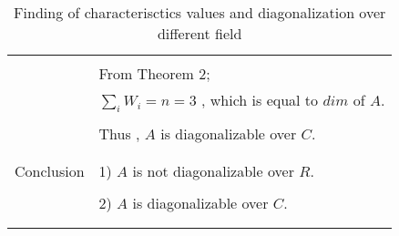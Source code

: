 \begin{longtable}{|l|l|}
&\\
& From Theorem 2;\\
& $\sum_{i} W_i = n = 3$ , which is equal to $dim$ of $A$.\\
&\\
& Thus , $A$ is diagonalizable over $C$.\\
&\\
\hline
\multirow{3}{*}{Conclusion} & \\
& 1) $A$ is not diagonalizable over $R$. \\
&\\
& 2) $A$ is diagonalizable over $C$.\\
&\\
\hline
\caption{Finding of characterisctics values and diagonalization over different field}
\label{eq:solutions/6/2/5/table:2}
\end{longtable}
